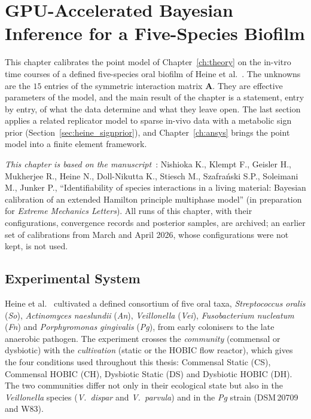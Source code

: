 \chapter{GPU-Accelerated Bayesian Inference for a Five-Species Biofilm}
\label{ch:heine}

This chapter calibrates the point model of Chapter~\ref{ch:theory} on the
in-vitro time courses of a defined five-species oral biofilm of Heine et
al.~\cite{Heine2025PeriImplant}. The unknowns are the
$15$ entries of the symmetric interaction matrix $\mathbf{A}$. They are
effective parameters of the model, and the main result of the chapter is a
statement, entry by entry, of what the data determine and what they leave
open. The last section applies a related replicator model to sparse in-vivo data
with a metabolic sign prior (Section~\ref{sec:heine_signprior}), and
Chapter~\ref{ch:ansys} brings the point model into a finite element framework.

\medskip\noindent\textit{This chapter is based on the manuscript}~\cite{NishiokaEML2026}:
Nishioka K., Klempt F., Geisler H., Mukherjee R., Heine N., Doll-Nikutta K.,
Stiesch M., Szafra\'{n}ski S.P., Soleimani M., Junker P., ``Identifiability of
species interactions in a living material: Bayesian calibration of an extended
Hamilton principle multiphase model'' (in preparation for \textit{Extreme
Mechanics Letters}). All runs of this chapter, with their configurations,
convergence records and posterior samples, are archived; an earlier set of
calibrations from March and April 2026, whose configurations were not kept, is
not used.

\section{Experimental System}
\label{sec:heine_data}

Heine et al.~\cite{Heine2025PeriImplant} cultivated a defined consortium of five
oral taxa, \textit{Streptococcus oralis} (\textit{So}),
\textit{Actinomyces naeslundii} (\textit{An}), \textit{Veillonella}
(\textit{Vei}), \textit{Fusobacterium nucleatum} (\textit{Fn}) and
\textit{Porphyromonas gingivalis} (\textit{Pg}), from early colonisers to the
late anaerobic pathogen. The experiment crosses the \emph{community}
(commensal or dysbiotic) with the \emph{cultivation} (static or the HOBIC flow
reactor), which gives the four conditions used throughout this thesis:
Commensal Static (CS), Commensal HOBIC (CH), Dysbiotic Static (DS) and
Dysbiotic HOBIC (DH). The two communities differ not only in their ecological
state but also in the \textit{Veillonella} species (\textit{V.~dispar} and
\textit{V.~parvula}) and in the \textit{Pg} strain (DSM\,20709 and W83).

